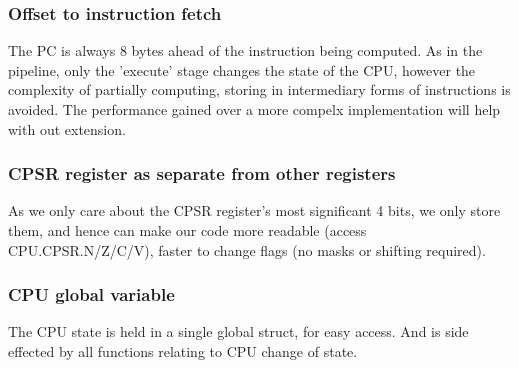 \documentclass[11pt]{article}
\begin{document}
        \subsubsection*{Offset to instruction fetch}
           The PC is always 8 bytes ahead of the instruction being computed. As in the pipeline, only the 'execute' stage changes the state of the CPU, however the complexity of partially computing, storing in intermediary forms of instructions is avoided.
            The performance gained over a more compelx implementation will help with out extension.
        \subsubsection*{CPSR register as separate from other registers}
            As we only care about the CPSR register's most significant 4 bits, we only store them, and hence can make our code more readable (access CPU.CPSR.N/Z/C/V), faster to change flags (no masks or shifting required).
        \subsubsection*{CPU global variable}
            The CPU state is held in a single global struct, for easy access. And is side effected by all functions relating to CPU change of state.
\end{document}
